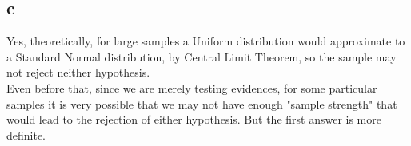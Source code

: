 \documentclass[11pt]{article}
\begin{document}
\subsection*{c}

Yes, theoretically, for large samples a Uniform distribution would approximate to a Standard Normal distribution, by Central Limit Theorem, so the sample may not reject neither hypothesis. \\

Even before that, since we are merely testing evidences, for some particular samples it is very possible that we may not have enough "sample strength" that would lead to the rejection of either hypothesis. But the first answer is more definite.
\end{document}
